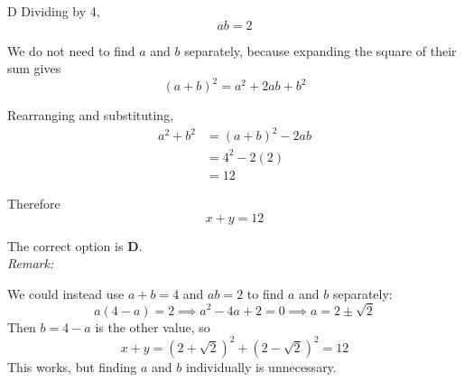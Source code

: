 \documentclass[11pt,a4paper]{article}
\begin{document}
\begin{enumerate}[label=\textbf{\arabic*.},leftmargin=*,itemsep=0pt,start=19]
\begin{djsSolution}{D}
Dividing by $4$,
\[
\boxed{ab=2}
\]

We do not need to find $a$ and $b$ separately, because expanding the square of their sum gives
\[
(a+b)^2=a^2+2ab+b^2
\]

Rearranging and substituting,
\[
\begin{aligned}
a^2+b^2&=(a+b)^2-2ab\\[5pt]
&=4^2-2(2)\\[5pt]
&=12
\end{aligned}
\]

Therefore
\[
x+y=12
\]

The correct option is \textbf{D}.\\[5pt]

\textit{Remark:} 

We could instead use $a+b=4$ and $ab=2$ to find $a$ and $b$ separately:
\[
a(4-a)=2
\implies a^2-4a+2=0
\implies a=2\pm\sqrt2
\]
Then $b=4-a$ is the other value, so
\[
x+y=(2+\sqrt2)^2+(2-\sqrt2)^2=12
\]
This works, but finding $a$ and $b$ individually is unnecessary. 
\end{djsSolution}
\end{enumerate}
\clearpage
\thispagestyle{djssolutions}
\vspace*{8pt}
\end{document}
